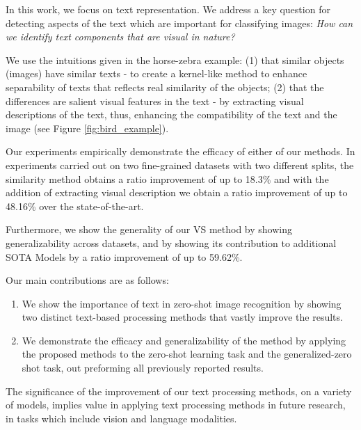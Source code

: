 \documentclass[11pt,a4paper]{article}
\begin{document}
In this work, we focus on text representation. We address a key question for detecting aspects of the text which are important for classifying images: \textit {How can we identify text components that are visual in nature?}


We use the intuitions given in the horse-zebra example: (1) that similar objects (images) have similar texts - to create a kernel-like method to enhance separability of texts that reflects real similarity of the objects; (2) that the differences are salient visual features in the text - by extracting visual descriptions of the text, thus, enhancing the compatibility of the text and the image (see Figure \ref{fig:bird_example}).\par

\par


Our experiments empirically demonstrate the 
efficacy of either of our methods. 
In experiments carried out on two fine-grained datasets with two different splits, the similarity method obtains a ratio improvement of up to 18.3\% and with the addition of extracting visual description we obtain a ratio improvement of up to 48.16\% over the state-of-the-art.

Furthermore, we show the generality of our VS method by showing generalizability across datasets, and by showing its contribution to additional SOTA Models by a ratio improvement of up to 59.62\%.



Our main contributions are as follows:  
\begin{enumerate}
  \item We show the importance of text in zero-shot image recognition by showing two distinct text-based processing methods that vastly improve the results.
  
\item We demonstrate the efficacy and generalizability of the method by applying the proposed methods to the zero-shot learning task and the generalized-zero shot task, out preforming all previously reported results.
    

\end{enumerate}

The significance of the improvement of our text processing methods, on a variety of models, implies value in applying text processing methods in future research, in tasks which include vision and language modalities.
\end{document}
